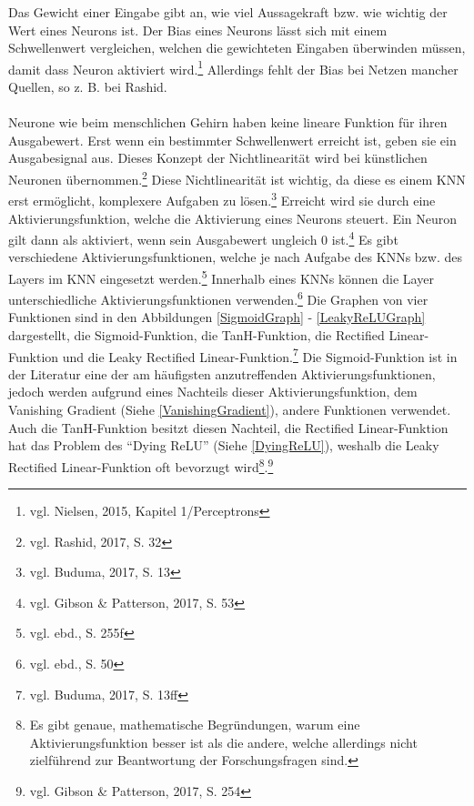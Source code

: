 \documentclass[a4paper,12pt,ngerman,oneside]{scrreprt}	%
\begin{document}
			Das Gewicht einer Eingabe gibt an, wie viel Aussagekraft bzw. wie wichtig der Wert eines Neurons ist. Der Bias eines Neurons lässt sich mit einem Schwellenwert vergleichen, welchen die gewichteten Eingaben überwinden müssen, damit dass Neuron aktiviert wird.\footnote{vgl. Nielsen, 2015, Kapitel 1/Perceptrons} Allerdings fehlt der Bias bei Netzen mancher Quellen, so z. B. bei Rashid.
			\ \\
			\ \\
			Neurone wie beim menschlichen Gehirn haben keine lineare Funktion für ihren Ausgabewert. Erst wenn ein bestimmter Schwellenwert erreicht ist, geben sie ein Ausgabesignal aus. Dieses Konzept der Nichtlinearität wird bei künstlichen Neuronen übernommen.\footnote{vgl. Rashid, 2017, S. 32} Diese Nichtlinearität ist wichtig, da diese es einem KNN erst ermöglicht, komplexere Aufgaben zu lösen.\footnote{vgl. Buduma, 2017, S. 13} Erreicht wird sie durch eine Aktivierungsfunktion, welche die Aktivierung eines Neurons steuert. Ein Neuron gilt dann als aktiviert, wenn sein Ausgabewert ungleich 0 ist.\footnote{vgl. Gibson \& Patterson, 2017, S. 53} Es gibt verschiedene Aktivierungsfunktionen, welche je nach Aufgabe des KNNs bzw. des Layers im KNN eingesetzt werden.\footnote{vgl. ebd., S. 255f} Innerhalb eines KNNs können die Layer unterschiedliche Aktivierungsfunktionen verwenden.\footnote{vgl. ebd., S. 50} Die Graphen von vier Funktionen sind in den Abbildungen \ref{SigmoidGraph} - \ref{LeakyReLUGraph} dargestellt, die Sigmoid-Funktion, die TanH-Funktion, die Rectified Linear-Funktion und die Leaky Rectified Linear-Funktion.\footnote{vgl. Buduma, 2017, S. 13ff} Die Sigmoid-Funktion ist in der Literatur eine der am häufigsten anzutreffenden Aktivierungsfunktionen, jedoch werden aufgrund eines Nachteils dieser Aktivierungsfunktion, dem Vanishing Gradient (Siehe \ref{VanishingGradient}), andere Funktionen verwendet. Auch die TanH-Funktion besitzt diesen Nachteil, die Rectified Linear-Funktion hat das Problem des "`Dying ReLU"' (Siehe \ref{DyingReLU}), weshalb die Leaky Rectified Linear-Funktion oft bevorzugt wird\footnote{Es gibt genaue, mathematische Begründungen, warum eine Aktivierungsfunktion besser ist als die andere, welche allerdings nicht zielführend zur Beantwortung der Forschungsfragen sind.}.\footnote{vgl. Gibson \& Patterson, 2017, S. 254}
			 
\end{document}
